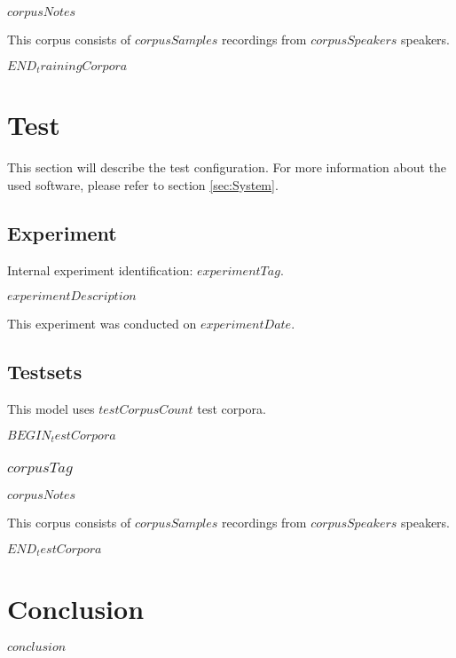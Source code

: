 \documentclass[a4paper,10pt,bibtotoc]{scrartcl}
\begin{document}
\begin{multicols}{2}
$corpusNotes$

This corpus consists of $corpusSamples$ recordings from $corpusSpeakers$ speakers.

$END_trainingCorpora$

\section{Test}

This section will describe the test configuration. For more information about the used software, please refer to section \ref{sec:System}.

\subsection{Experiment}

Internal experiment identification: $experimentTag$.

$experimentDescription$

This experiment was conducted on $experimentDate$.

\subsection{Testsets}

This model uses $testCorpusCount$ test corpora.

$BEGIN_testCorpora$
\subsubsection{$corpusTag$}

$corpusNotes$

This corpus consists of $corpusSamples$ recordings from $corpusSpeakers$ speakers.

$END_testCorpora$


\section{Conclusion}
$conclusion$

\end{multicols}
\end{document}
